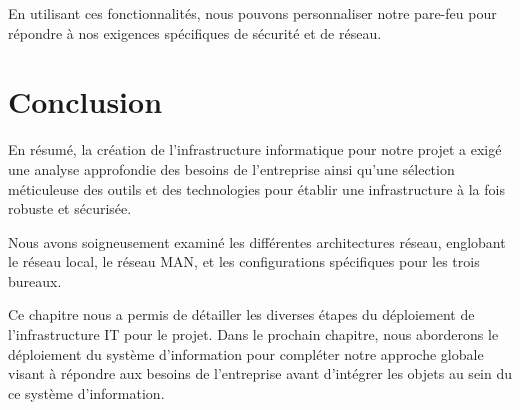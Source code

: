 En utilisant ces fonctionnalités, nous pouvons personnaliser notre pare-feu pour répondre à nos exigences spécifiques de sécurité et de réseau.

\section{Conclusion}

En résumé, la création de l'infrastructure informatique pour notre projet a exigé une analyse approfondie des besoins de l'entreprise ainsi qu'une sélection méticuleuse des outils et des technologies pour établir une infrastructure à la fois robuste et sécurisée.

Nous avons soigneusement examiné les différentes architectures réseau, englobant le réseau local, le réseau MAN, et les configurations spécifiques pour les trois bureaux.

Ce chapitre nous a permis de détailler les diverses étapes du déploiement de l'infrastructure IT pour le projet. Dans le prochain chapitre, nous aborderons le déploiement du système d'information pour compléter notre approche globale visant à répondre aux besoins de l'entreprise avant d'intégrer les objets au sein du ce système d'information.
